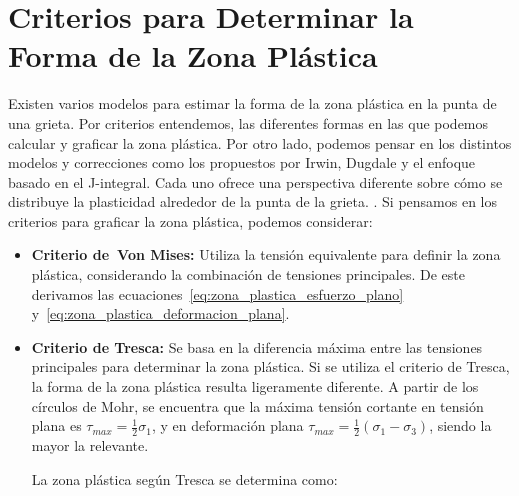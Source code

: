 \documentclass[12pt,letterpaper]{article}
\begin{document}
\section{Criterios para Determinar la Forma de la Zona Plástica}
Existen varios modelos para estimar la forma de la zona plástica en la punta de una grieta. Por criterios entendemos, las diferentes formas en las que podemos calcular y graficar la zona plástica. Por otro lado, podemos pensar en los distintos modelos y correcciones como los propuestos por Irwin, Dugdale y el enfoque basado en el J-integral. Cada uno ofrece una perspectiva diferente sobre cómo se distribuye la plasticidad alrededor de la punta de la grieta. \cite{Broek1982, Cameron2022, Jaramillo2008, MechanicalBehavior2022, Ponson2022}.
Si pensamos en los criterios para graficar la zona plástica, podemos considerar:
\begin{itemize}
    \item \textbf{Criterio de~Von Mises:} Utiliza la tensión equivalente para definir la zona plástica, considerando la combinación de tensiones principales. De este derivamos las ecuaciones~\ref{eq:zona_plastica_esfuerzo_plano} y~\ref{eq:zona_plastica_deformacion_plana}.
    \item \textbf{Criterio de Tresca:} Se basa en la diferencia máxima entre las tensiones principales para determinar la zona plástica.
    Si se utiliza el criterio de Tresca, la forma de la zona plástica resulta ligeramente diferente. A partir de los círculos de Mohr, se encuentra que la máxima tensión cortante en tensión plana es $\tau_{max} = \frac{1}{2}\sigma_1$, y en deformación plana $\tau_{max} = \frac{1}{2}(\sigma_1 - \sigma_3)$, siendo la mayor la relevante.
    
    La zona plástica según Tresca se determina como:
    

\end{itemize}
\end{document}
